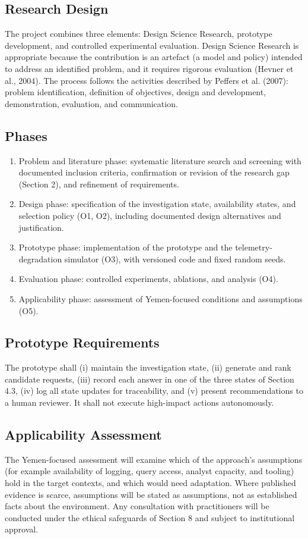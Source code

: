 \documentclass[a4paper,11pt,oneside]{article}
\begin{document}
\subsection{Research Design}
The project combines three elements: Design Science Research, prototype development, and controlled experimental evaluation. Design Science Research is appropriate because the contribution is an artefact (a model and policy) intended to address an identified problem, and it requires rigorous evaluation (Hevner et al., 2004). The process follows the activities described by Peffers et al. (2007): problem identification, definition of objectives, design and development, demonstration, evaluation, and communication.
\subsection{Phases}
\begin{enumerate}[leftmargin=*, itemsep=2pt, topsep=3pt]
\item Problem and literature phase: systematic literature search and screening with
documented inclusion criteria, confirmation or revision of the research gap (Section 2), and refinement of requirements.
\item Design phase: specification of the investigation state, availability states, and
selection policy (O1, O2), including documented design alternatives and justification.
\item Prototype phase: implementation of the prototype and the telemetry-degradation
simulator (O3), with versioned code and fixed random seeds.
\item Evaluation phase: controlled experiments, ablations, and analysis (O4).
\item Applicability phase: assessment of Yemen-focused conditions and assumptions
(O5).
\end{enumerate}
\subsection{Prototype Requirements}
The prototype shall (i) maintain the investigation state, (ii) generate and rank candidate requests, (iii) record each answer in one of the three states of Section 4.3, (iv) log all state updates for traceability, and (v) present recommendations to a human reviewer. It shall not execute high-impact actions autonomously.
\subsection{Applicability Assessment}
The Yemen-focused assessment will examine which of the approach’s assumptions (for example availability of logging, query access, analyst capacity, and tooling) hold in the target contexts, and which would need adaptation. Where published evidence is scarce, assumptions will be stated as assumptions, not as established facts about the environment. Any consultation with practitioners will be conducted under the ethical safeguards of Section 8 and subject to institutional approval.
\end{document}
